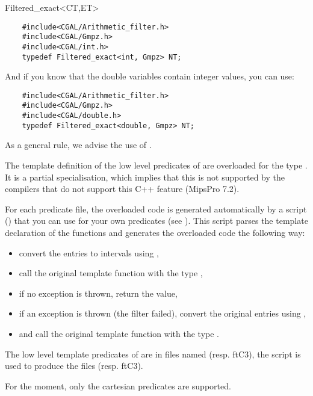\begin{ccClass} {Filtered_exact<CT,ET>}
\begin{verbatim}
    #include<CGAL/Arithmetic_filter.h>
    #include<CGAL/Gmpz.h>
    #include<CGAL/int.h>
    typedef Filtered_exact<int, Gmpz> NT;
\end{verbatim}

And if you know that the double variables contain integer values, you can
use:

\begin{verbatim}
    #include<CGAL/Arithmetic_filter.h>
    #include<CGAL/Gmpz.h>
    #include<CGAL/double.h>
    typedef Filtered_exact<double, Gmpz> NT;
\end{verbatim}

As a general rule, we advise the use of
.

\ccImplementation

The template definition of the low level predicates of \cgal are overloaded for
the type .  It is a partial specialisation,
which implies that this is not supported by the compilers that do not support
this C++ feature (MipsPro 7.2).

For each predicate file, the overloaded code is generated automatically by a
 script
() that you can
use for your own predicates (see ).
This script parses the template declaration of the functions and generates the
overloaded code the following way:
\begin{itemize}
\item convert the entries to intervals using
    ,
\item call the original template function with the type
    ,
\item if no exception is thrown, return the value,
\item if an exception is thrown (the filter failed), convert the original
    entries using ,
\item and call the original template function with the type .
\end{itemize}

\ccExample

The low level template predicates of \cgal are in files named
 (resp. ftC3), the script is used
to produce the files 
(resp. ftC3).

For the moment, only the cartesian predicates are supported.

\end{ccClass}
